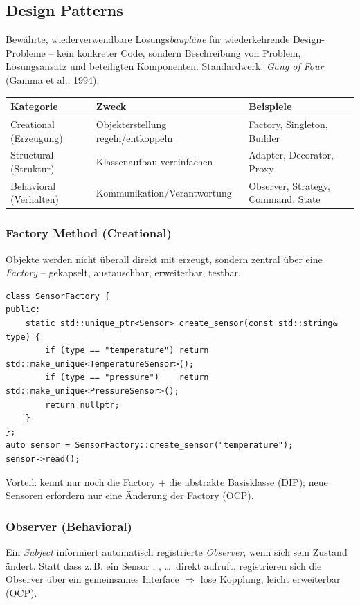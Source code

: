 \subsection{Design Patterns}
\begin{definition}
Bew\"ahrte, wiederverwendbare L\"osungs\emph{baupl\"ane} f\"ur wiederkehrende Design-Probleme -- kein konkreter Code, sondern Beschreibung von Problem, L\"osungsansatz und beteiligten Komponenten. Standardwerk: \emph{Gang of Four} (Gamma et al., 1994).
\end{definition}
\begin{center}\small
\begin{tabular}{@{}lll@{}}
\toprule
\textbf{Kategorie} & \textbf{Zweck} & \textbf{Beispiele} \\
\midrule
Creational (Erzeugung) & Objekterstellung regeln/entkoppeln & Factory, Singleton, Builder \\
Structural (Struktur) & Klassenaufbau vereinfachen & Adapter, Decorator, Proxy \\
Behavioral (Verhalten) & Kommunikation/Verantwortung & Observer, Strategy, Command, State \\
\bottomrule
\end{tabular}
\end{center}

\subsubsection*{Factory Method (Creational)}
Objekte werden nicht \"uberall direkt mit  erzeugt, sondern zentral \"uber eine \emph{Factory} -- gekapselt, austauschbar, erweiterbar, testbar.
\begin{lstlisting}
class SensorFactory {
public:
    static std::unique_ptr<Sensor> create_sensor(const std::string& type) {
        if (type == "temperature") return std::make_unique<TemperatureSensor>();
        if (type == "pressure")    return std::make_unique<PressureSensor>();
        return nullptr;
    }
};
auto sensor = SensorFactory::create_sensor("temperature");
sensor->read();
\end{lstlisting}
Vorteil:  kennt nur noch die Factory + die abstrakte Basisklasse  (DIP); neue Sensoren erfordern nur eine \"Anderung der Factory (OCP).

\subsubsection*{Observer (Behavioral)}
Ein \emph{Subject} informiert automatisch registrierte \emph{Observer}, wenn sich sein Zustand \"andert. Statt dass z.\,B. ein Sensor , , \dots\ direkt aufruft, registrieren sich die Observer \"uber ein gemeinsames Interface $\Rightarrow$ lose Kopplung, leicht erweiterbar (OCP).

